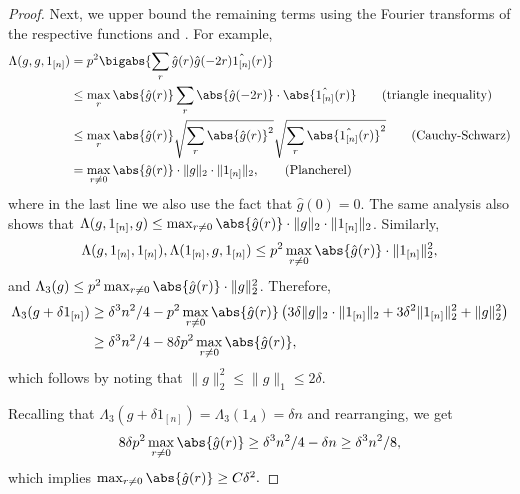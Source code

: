\documentclass{article}
\begin{document}
\begin{proof}
Next, we upper bound the remaining terms using the Fourier transforms of the respective functions and .
For example,
\begin{align*}
\Lambda(g,g,1_{[n]}) &= p^2\bigabs{\sum_{r}\hat{g}(r)\hat{g}(-2r)\hat{1_{[n]}}(r)} \\
&\leq \max_{r}\abs{\hat{g}(r)}\sum_r\abs{\hat{g}(-2r)}\cdot\abs{\hat{1_{[n]}}(r)} \tag{triangle inequality}\\
&\leq \max_{r}\abs{\hat{g}(r)}\sqrt{\sum_r\abs{\hat{g}(r)}^2}\sqrt{\sum_r\abs{\hat{1_{[n]}}(r)}^2} \tag{Cauchy-Schwarz}\\
&= \max_{r\neq 0}\abs{\hat{g}(r)}\cdot\|g\|_2\cdot\|1_{[n]}\|_2,\tag{Plancherel}
\end{align*}
where in the last line we also use the fact that $\hat{g}(0) = 0$. The same analysis also shows that $\Lambda(g,1_{[n]},g)\leq \max_{r\neq 0}\abs{\hat{g}(r)}\cdot\|g\|_2\cdot\|1_{[n]}\|_2$.
Similarly, 
$$\Lambda(g,1_{[n]},1_{[n]}),\Lambda(1_{[n]},g,1_{[n]}) \leq p^2\max_{r\neq 0}\abs{\hat{g}(r)}\cdot\|1_{[n]}\|_2^2,$$
and $\Lambda_3(g) \leq p^2\max_{r\neq 0}\abs{\hat{g}(r)}\cdot\|g\|_2^2$. Therefore,
\begin{align*}
    \Lambda_3(g+\delta1_{[n]}) &\geq \delta^3n^2/4 - p^2\max_{r\neq 0}\abs{\hat{g}(r)}\left(3\delta\|g\|_2\cdot\|1_{[n]}\|_2 + 3\delta^2\|1_{[n]}\|_2^2 + \|g\|_2^2\right) \\
    &\geq \delta^3n^2/4 - 8\delta p^2\max_{r\neq 0}\abs{\hat{g}(r)},
\end{align*}
which follows by noting that $\|g\|_2^2 \leq \|g\|_1 \leq 2\delta$.

Recalling that $\Lambda_3(g+\delta1_{[n]}) = \Lambda_3(1_{A}) = \delta n$ and rearranging, we get
$$8\delta p^2\max_{r\neq 0}\abs{\hat{g}(r)} \geq \delta^3n^2/4 - \delta n \geq \delta^3n^2/8,$$  which implies $\max_{r\neq 0}\abs{\hat{g}(r)}\geq C\delta^2.$
\end{proof}
\end{document}
